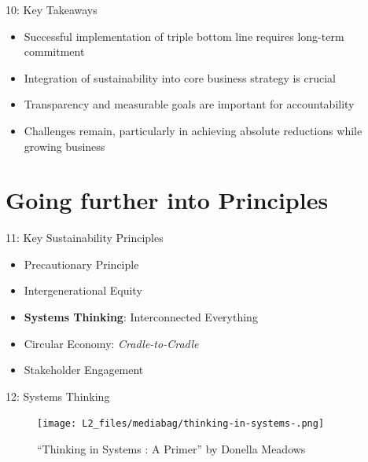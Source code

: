 \documentclass[
  ignorenonframetext,
]{beamer}
\providecommand{\tightlist}{%
  \setlength{\itemsep}{0pt}\setlength{\parskip}{0pt}}\usepackage{longtable,booktabs,array}
\begin{document}
\begin{frame}{10: Key Takeaways}
\label{key-takeaways}
\begin{itemize}
\tightlist
\item
  Successful implementation of triple bottom line requires long-term
  commitment
\item
  Integration of sustainability into core business strategy is crucial
\item
  Transparency and measurable goals are important for accountability
\item
  Challenges remain, particularly in achieving absolute reductions while
  growing business
\end{itemize}
\end{frame}

\section{Going further into
Principles}\label{going-further-into-principles}

\begin{frame}{11: Key Sustainability Principles}
\label{key-sustainability-principles}
\begin{itemize}
\tightlist
\item
  Precautionary Principle
\item
  Intergenerational Equity
\item
  \textbf{Systems Thinking}: Interconnected Everything
\item
  Circular Economy: \emph{Cradle-to-Cradle}
\item
  Stakeholder Engagement
\end{itemize}
\end{frame}

\begin{frame}{12: Systems Thinking}
\label{systems-thinking}
\begin{figure}[H]

{\centering \texttt{[image: L2\_files/mediabag/thinking-in-systems-.png]}

}

\caption{``Thinking in Systems : A Primer'' by Donella Meadows}

\end{figure}%
\end{frame}
\end{document}
